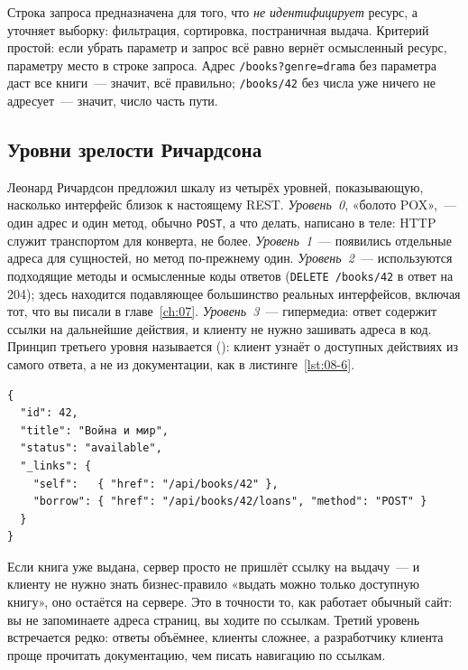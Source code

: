 Строка запроса предназначена для того, что \emph{не идентифицирует} ресурс, а
уточняет выборку: фильтрация, сортировка, постраничная выдача. Критерий
простой: если убрать параметр и запрос всё равно вернёт осмысленный ресурс,
параметру место в строке запроса. Адрес \texttt{/books?genre=drama} без
параметра даст все книги~--- значит, всё правильно; \texttt{/books/42} без
числа уже ничего не адресует~--- значит, число часть пути.

\subsection{Уровни зрелости Ричардсона}

Леонард Ричардсон предложил шкалу из четырёх уровней, показывающую, насколько
интерфейс близок к настоящему REST. \emph{Уровень~0}, «болото POX»,~--- один
адрес и один метод, обычно \texttt{POST}, а что делать, написано в теле: HTTP
служит транспортом для конверта, не более. \emph{Уровень~1}~--- появились
отдельные адреса для сущностей, но метод по-прежнему один. \emph{Уровень~2}~---
используются подходящие методы и осмысленные коды ответов
(\texttt{DELETE /books/42} в ответ на 204); здесь находится подавляющее
большинство реальных интерфейсов, включая тот, что вы писали в
главе~\ref{ch:07}. \emph{Уровень~3}~--- гипермедиа: ответ содержит ссылки на
дальнейшие действия, и клиенту не нужно зашивать адреса в код. Принцип третьего
уровня называется  (): клиент узнаёт о доступных действиях из самого ответа, а не из
документации, как в листинге~\ref{lst:08-6}.

\begin{listing}[H]
\begin{verbatim}
{
  "id": 42,
  "title": "Война и мир",
  "status": "available",
  "_links": {
    "self":   { "href": "/api/books/42" },
    "borrow": { "href": "/api/books/42/loans", "method": "POST" }
  }
}
\end{verbatim}
\caption{Ответ третьего уровня зрелости}
\label{lst:08-6}
\end{listing}

Если книга уже выдана, сервер просто не пришлёт ссылку на выдачу~--- и клиенту
не нужно знать бизнес-правило «выдать можно только доступную книгу», оно
остаётся на сервере. Это в точности то, как работает обычный сайт: вы не
запоминаете адреса страниц, вы ходите по ссылкам. Третий уровень встречается
редко: ответы объёмнее, клиенты сложнее, а разработчику клиента проще прочитать
документацию, чем писать навигацию по ссылкам.

